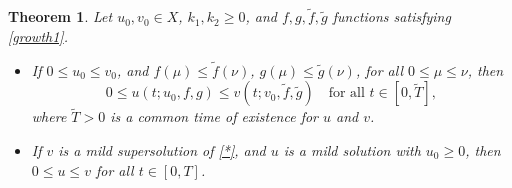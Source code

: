\documentclass[a4,psfig,english,12pt,epsf,portrait]{article}
\newtheorem{theorem}{Theorem}[section]
\numberwithin{equation}{section}
\begin{document}
\begin{theorem}\label{comparison}
	Let $u_0,v_0\in X$, $k_1,k_2\geq 0$, and $f,g, \tilde{f}, \tilde{g}$ functions satisfying \eqref{growth1}.
	\begin{itemize}
		\item[(i)] If $0\leq u_0\leq v_0$, and $f(\mu)\leq \tilde{f}(\nu)$, $g(\mu)\leq \tilde{g}(\nu)$, for all $0\leq\mu\leq \nu$, then 
		$$0\leq u(t;u_0,f,g) \leq v(t;v_0,\tilde{f},\tilde{g})\quad\text{for all}\,\, t\in[0,\tilde{T}],$$
		where $\tilde{T}>0$ is a common time of existence for $u$ and $v$.
		\item[(ii)]  If $v$ is a mild supersolution of \eqref{*}, and $u$ is a mild solution with $u_0\geq0$, then $0\leq u\leq v$ for all $t\in[0,T]$.
	\end{itemize}
\end{theorem}
\end{document}
